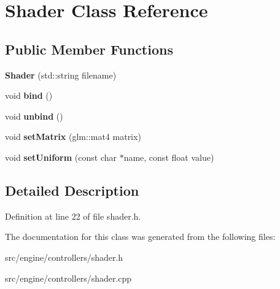 \section{Shader Class Reference}
\label{class_shader}
\subsection*{Public Member Functions}
\begin{DoxyCompactItemize}
\item 
\mbox{\label{class_shader_a0436a2c70cb462cf8de6921d93b082ae}} 
{\bfseries Shader} (std\+::string filename)
\item 
\mbox{\label{class_shader_a6f6e280a343d6c7662909f7dfbc89ad9}} 
void {\bfseries bind} ()
\item 
\mbox{\label{class_shader_a227a45de0b25215955560defe26660ff}} 
void {\bfseries unbind} ()
\item 
\mbox{\label{class_shader_ae92885810dd0ecdb48c492d7add0f3f1}} 
void {\bfseries set\+Matrix} (glm\+::mat4 matrix)
\item 
\mbox{\label{class_shader_a1d8529baf274e6f710d25d71f0cf2c77}} 
void {\bfseries set\+Uniform} (const char $\ast$name, const float value)
\end{DoxyCompactItemize}


\subsection{Detailed Description}


Definition at line 22 of file shader.\+h.



The documentation for this class was generated from the following files\+:\begin{DoxyCompactItemize}
\item 
src/engine/controllers/shader.\+h\item 
src/engine/controllers/shader.\+cpp\end{DoxyCompactItemize}
